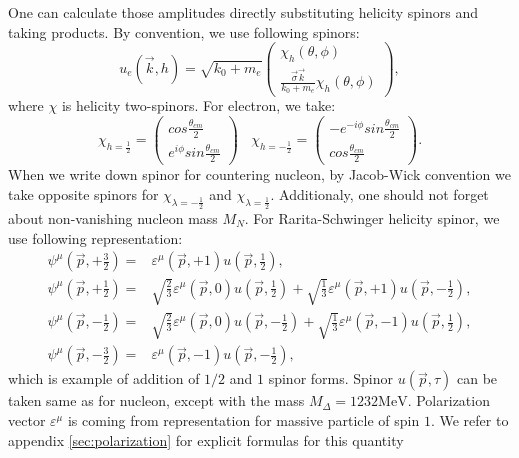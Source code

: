 \documentclass[12pt]{revtex4-1}
\newcommand{\hp}{{\frac{1}{2}}}
\newcommand{\hm}{{-\frac{1}{2}}}
\newcommand{\cma}{{\theta_{cm}}}
\begin{document}
	One can calculate those amplitudes directly substituting helicity spinors
	and taking products. By convention, we use following spinors:
	\begin{equation}
		u_e(\vec k, h) = \sqrt{k_0 + m_e} \left(
			\begin{array}{ll}
				\chi_h(\theta, \phi) \\
				\frac{\vec{\sigma} \vec{k}}{k_0 + m_e} \chi_h(\theta, \phi)
			\end{array}
			\right),
	\end{equation}
	where $\chi$ is helicity two-spinors. For electron, we take:
	\begin{equation}
		\chi_{h=\hp} = 
		\left( \begin{array}{c}
		cos \frac{\cma}{2} \\
		e^{i \phi} sin \frac{\cma}{2} 
		\end{array} \right) ~~~~
		\chi_{h=\hm} =  
		\left( \begin{array}{c}
		- e^{- i \phi}  sin \frac{\cma}{2} \\
		cos \frac{\cma}{2} 
		\end{array} \right).  \nonumber
	\end{equation}
	When we write down spinor for countering nucleon, by Jacob-Wick convention
	we take opposite spinors for $\chi_{\lambda=\hm}$ and $\chi_{\lambda=\hp}$.
	Additionaly, one should not forget about non-vanishing nucleon mass $M_N$.
	For Rarita-Schwinger helicity spinor, we use following representation:
	\begin{align}
		 \psi^{\mu} (\vec p, +\frac{3}{2}) = &
		 \varepsilon^{\mu}(\vec p, +1) u(\vec p, \hp),
		 \\
		 \psi^{\mu} (\vec p, +\frac{1}{2}) = &
		 \sqrt{\frac{2}{3}} \varepsilon^{\mu}(\vec p, 0) u(\vec p, \hp) +
		 \sqrt{\frac{1}{3}} \varepsilon^{\mu}(\vec p, +1) u(\vec p, \hm),
		 \\
		 \psi^{\mu} (\vec p, -\frac{1}{2}) = &
		 \sqrt{\frac{2}{3}} \varepsilon^{\mu}(\vec p, 0) u(\vec p, \hm) +
		 \sqrt{\frac{1}{3}} \varepsilon^{\mu}(\vec p, -1) u(\vec p, \hp),
		 \\
		 \psi^{\mu} (\vec p, -\frac{3}{2}) = &
		 \varepsilon^{\mu}(\vec p, -1) u(\vec p, \hm),
	\end{align}
	which is example of addition of $1/2$ and $1$ spinor forms.
	Spinor $u(\vec p, \tau)$ can be taken same as for nucleon, except with
	the mass $M_\Delta = 1232 \text{MeV}$. Polarization vector $\varepsilon^{\mu}$
	is coming from representation for massive particle of spin $1$.
	We refer to appendix \ref{sec:polarization} for explicit formulas for this quantity
\end{document}
